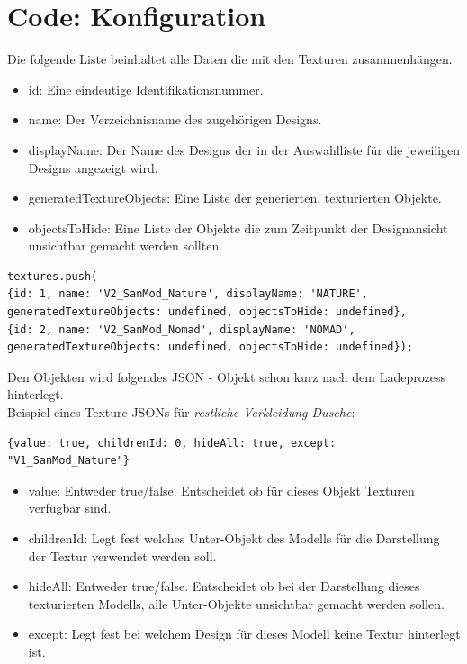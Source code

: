 \section{Code: Konfiguration}\label{sec:Code: Konfiguration}
Die folgende Liste beinhaltet alle Daten die mit den Texturen zusammenhängen. 
\begin{itemize}
    \item id: Eine eindeutige Identifikationsnummer. 
    \item name: Der Verzeichnisname des zugehörigen Designs.
    \item displayName: Der Name des Designs der in der Auswahlliste für die jeweiligen Designs angezeigt wird.
    \item generatedTextureObjects: Eine Liste der generierten, texturierten Objekte.
    \item objectsToHide: Eine Liste der Objekte die zum Zeitpunkt der Designansicht unsichtbar gemacht werden sollten.
\end{itemize}
\begin{lstlisting}
textures.push(
{id: 1, name: 'V2_SanMod_Nature', displayName: 'NATURE', generatedTextureObjects: undefined, objectsToHide: undefined},
{id: 2, name: 'V2_SanMod_Nomad', displayName: 'NOMAD', generatedTextureObjects: undefined, objectsToHide: undefined});
\end{lstlisting}
Den Objekten wird folgendes JSON - Objekt schon kurz nach dem Ladeprozess hinterlegt.\\
Beispiel eines Texture-JSONs für \textit{restliche-Verkleidung-Dusche}:
\begin{lstlisting}
{value: true, childrenId: 0, hideAll: true, except: "V1_SanMod_Nature"}
\end{lstlisting}
\begin{itemize}
    \item value: Entweder true/false. Entscheidet ob für dieses Objekt Texturen verfügbar sind.
    \item childrenId: Legt fest welches Unter-Objekt des Modells für die Darstellung der Textur verwendet werden soll.
    \item hideAll: Entweder true/false. Entscheidet ob bei der Darstellung dieses texturierten Modells, alle Unter-Objekte unsichtbar gemacht werden sollen.
    \item except: Legt fest bei welchem Design für dieses Modell keine Textur hinterlegt ist.
\end{itemize}
\newpage
